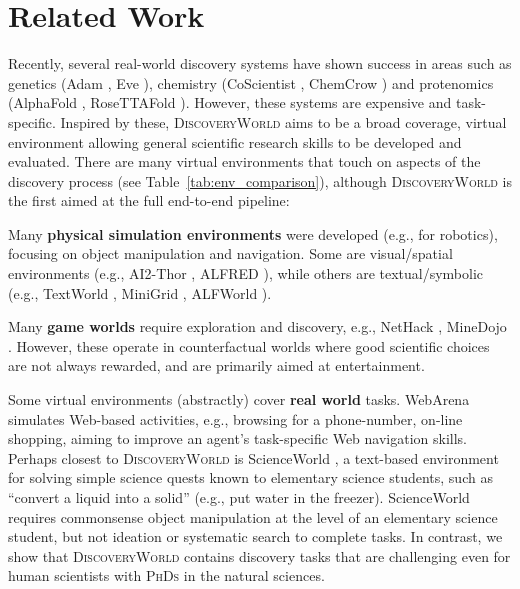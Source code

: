 \documentclass{article}
\newcommand{\env}{\textsc{DiscoveryWorld}\xspace}
\begin{document}







\section{Related Work}

Recently, several real-world discovery systems have shown success in areas such as genetics (Adam \citep{King2004FunctionalGH}, Eve \citep{Williams2015CheaperFD}),
chemistry (CoScientist \citep{Boiko2023AutonomousCR}, ChemCrow \citep{Bran2023AugmentingLL}) and protenomics
  (AlphaFold \citep{Jumper2021HighlyAP}, RoseTTAFold \citep{Krishna2023GeneralizedBM}). However, these systems
are expensive and task-specific. Inspired by these, \env aims to be a broad coverage, virtual
environment allowing general scientific research skills to be developed and evaluated.
There are many virtual environments that touch on aspects of the discovery
process (see Table~\ref{tab:env_comparison}), although \env is the first aimed at the full end-to-end pipeline:

Many {\bf physical simulation environments} were developed (e.g., for
robotics), focusing on object manipulation and navigation. Some are
visual/spatial environments (e.g., AI2-Thor \citep{Kolve2017AI2THORAI}, ALFRED \cite{ALFRED20}),
while others are textual/symbolic (e.g., TextWorld \cite{Ct2018TextWorldAL}, MiniGrid \cite{MinigridMiniworld23}, ALFWorld \cite{Shridhar2020ALFWorldAT}).

Many {\bf game worlds} require exploration and discovery, e.g., NetHack \citep{NetHack}, MineDojo \cite{fan2022minedojo}.
However, these operate in counterfactual worlds where good scientific choices
are not always rewarded, and are primarily aimed at entertainment.

Some virtual environments (abstractly) cover {\bf real world} tasks.
WebArena \citep{zhou2024webarena} simulates Web-based activities, e.g., browsing for a phone-number, on-line shopping,
aiming to improve an agent's task-specific Web navigation skills. Perhaps closest
to \env is ScienceWorld \citep{Wang2022ScienceWorldIY}, a text-based environment for solving simple science
quests known to elementary science students, such as ``convert a liquid into a solid'' (e.g., put water in the freezer).
ScienceWorld requires commonsense object manipulation at the level of an elementary science student, but not ideation or systematic search to complete tasks. In contrast, we show that \env contains discovery tasks that are challenging even for human scientists with \textsc{PhDs} in the natural sciences.
\end{document}
